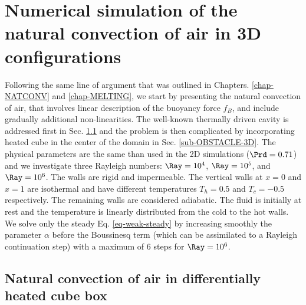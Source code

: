 \section{Numerical simulation of the natural convection of air in 3D configurations}\label{sec: natconv-air-3D}
 Following the same line of argument that was outlined in Chapters. \ref{chap-NATCONV} and \ref{chap-MELTING}, we start by presenting the natural convection of air, that involves linear description of the buoyancy force $f_B$, and include gradually additional non-linearities.
The well-known thermally driven cavity is addressed first in Sec. \ref{subsec-3D-natconv-air} and the problem is then complicated by incorporating heated cube in the center of the domain in Sec. \ref{sub-OBSTACLE-3D}.
The physical parameters are the same than used in the 2D simulations ($\Prd = 0.71$) and we investigate three Rayleigh numbers: $\Ray=10^4$, $\Ray=10^5$, and $\Ray=10^6$. 
The walls are rigid and impermeable. The vertical walls at $x=0$ and $x=1$ are isothermal and have different temperatures $T_h=0.5$ and $T_c=-0.5$ respectively. The remaining walls are considered adiabatic. 
The fluid is initially at rest and the temperature is linearly distributed from the cold to the hot walls.
We solve only the steady Eq. \ref{eq-weak-steady} by increasing smoothly the parameter $\alpha$ before the Boussinesq term (which can be assimilated to a Rayleigh continuation step) with a maximum of $6$ steps for $\Ray = 10^6$.

\subsection{Natural convection of air in differentially heated cube box} \label{subsec-3D-natconv-air}

